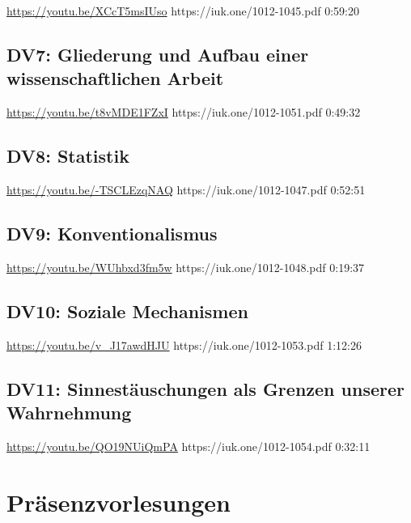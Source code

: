 \documentclass[a4paper]{article}%
\begin{document}
{\url{https://youtu.be/XCcT5msIUso}}
{https://iuk.one/1012-1045.pdf}
{0:59:20}

\subsection{DV7: Gliederung und Aufbau einer wissenschaftlichen Arbeit}

{\url{https://youtu.be/t8vMDE1FZxI}}
{https://iuk.one/1012-1051.pdf}
{0:49:32}



\subsection{DV8: Statistik}

{\url{https://youtu.be/-TSCLEzqNAQ}}
{https://iuk.one/1012-1047.pdf}
{0:52:51}



\subsection{DV9: Konventionalismus}

{\url{https://youtu.be/WUhbxd3fm5w}}
{https://iuk.one/1012-1048.pdf}
{0:19:37}



\subsection{DV10: Soziale Mechanismen}

{\url{https://youtu.be/v_J17awdHJU}}
{https://iuk.one/1012-1053.pdf}
{1:12:26}


\subsection{DV11: Sinnestäuschungen als Grenzen unserer Wahrnehmung}

{\url{https://youtu.be/QO19NUiQmPA}}
{https://iuk.one/1012-1054.pdf}
{0:32:11}





\clearpage
\section{Präsenzvorlesungen}\label{Prsenzvorlesung}
\end{document}
